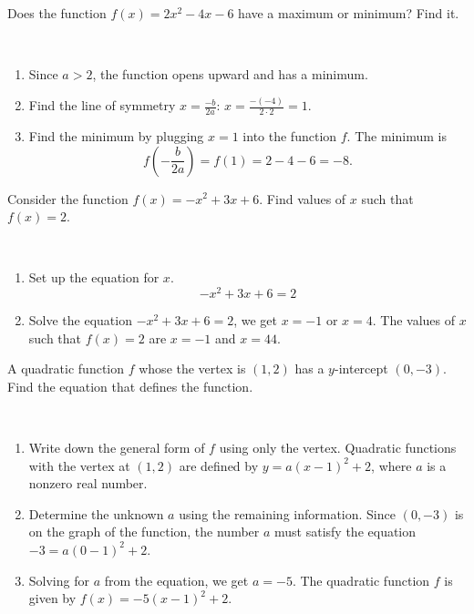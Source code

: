 \documentclass[en,12pt]{elegantbook}
\providecommand{\tightlist}{%
  \setlength{\itemsep}{0pt}\setlength{\parskip}{0pt}}
\let\BeginKnitrBlock\begin \let\EndKnitrBlock\end
\begin{document}
\BeginKnitrBlock{example}
\protect\hypertarget{exm:unnamed-chunk-281}{}{\label{exm:unnamed-chunk-281} }
Does the function \(f(x)=2x^2-4x-6\) have a maximum or minimum? Find it.
\EndKnitrBlock{example}

\BeginKnitrBlock{solution}
{}\\

\begin{enumerate}
\def\labelenumi{\arabic{enumi}.}
\tightlist
\item
  Since \(a>2\), the function opens upward and has a minimum.
\item
  Find the line of symmetry \(x=\frac{-b}{2a}\):
  \(x=\frac{-(-4)}{2\cdot 2}=1\).
\item
  Find the minimum by plugging \(x=1\) into the function \(f\).
  The minimum is
  \[
   f(-\frac{b}{2a})=f(1)=2-4-6=-8.
   \]
\end{enumerate}
\EndKnitrBlock{solution}

\BeginKnitrBlock{example}
\protect\hypertarget{exm:unnamed-chunk-283}{}{\label{exm:unnamed-chunk-283} }
Consider the function \(f(x)=-x^2+3x+6\). Find values of \(x\) such that \(f(x)=2\).
\EndKnitrBlock{example}

\BeginKnitrBlock{solution}
{}\\

\begin{enumerate}
\def\labelenumi{\arabic{enumi}.}
\tightlist
\item
  Set up the equation for \(x\).
  \[-x^2+3x+6=2\]
\item
  Solve the equation \(-x^2+3x+6=2\), we get \(x=-1\) or \(x=4\).
  The values of \(x\) such that \(f(x)=2\) are \(x=-1\) and \(x=44\).
\end{enumerate}
\EndKnitrBlock{solution}

\BeginKnitrBlock{example}
\protect\hypertarget{exm:unnamed-chunk-285}{}{\label{exm:unnamed-chunk-285} }
A quadratic function \(f\) whose the vertex is \((1, 2)\) has a \(y\)-intercept \((0, -3)\). Find the equation that defines the function.
\EndKnitrBlock{example}

\BeginKnitrBlock{solution}
{}\\

\begin{enumerate}
\def\labelenumi{\arabic{enumi}.}
\tightlist
\item
  Write down the general form of \(f\) using only the vertex.
  Quadratic functions with the vertex at \((1,2)\) are defined by \(y=a(x-1)^2+2\), where \(a\) is a nonzero real number.
\item
  Determine the unknown \(a\) using the remaining information.
  Since \((0, -3)\) is on the graph of the function, the number \(a\) must satisfy the equation \(-3=a(0-1)^2+2\).
\item
  Solving for \(a\) from the equation, we get \(a=-5\).
  The quadratic function \(f\) is given by \(f(x)=-5(x-1)^2+2\).
\end{enumerate}
\EndKnitrBlock{solution}
\end{document}
